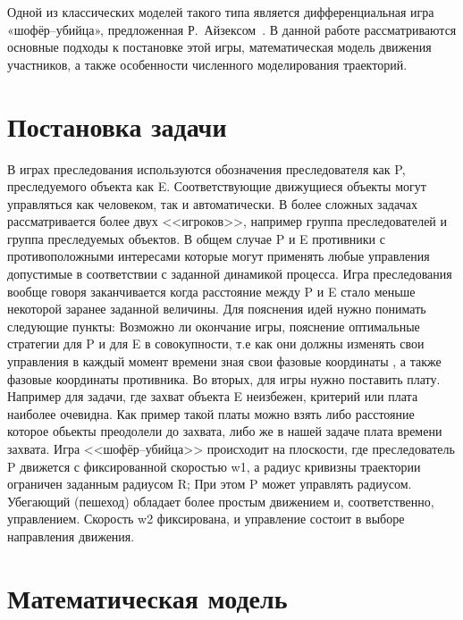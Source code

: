 \documentclass[14pt,a4paper]{extarticle}
\begin{document}
	Одной из классических моделей такого типа является дифференциальная игра «шофёр--убийца», предложенная Р.~Айзексом~\cite{isaacs}. В данной работе рассматриваются основные подходы к постановке этой игры, математическая модель движения участников, а также особенности численного моделирования траекторий.
	
	\section{Постановка задачи}
	
	В играх преследования используются обозначения преследователя как P, преследуемого объекта как E. Соответствующие движущиеся объекты могут управляться как человеком, так и автоматически. В более сложных задачах рассматривается более двух <<игроков>>, например группа преследователей и группа преследуемых объектов. В общем случае P и E противники с противоположными интересами которые могут применять любые управления допустимые в соответствии с заданной динамикой процесса. Игра преследования вообще говоря заканчивается когда расстояние между P и E стало меньше некоторой заранее заданной величины. Для пояснения идей нужно понимать следующие пункты: Возможно ли окончание игры, пояснение оптимальные стратегии для P и для E в совокупности, т.е как они должны изменять свои управления в каждый момент времени зная свои фазовые координаты , а также фазовые координаты противника. Во вторых, для игры нужно поставить плату. Например для задачи, где захват объекта E неизбежен, критерий или плата наиболее очевидна. Как пример такой платы можно взять либо расстояние которое обьекты преодолели до захвата, либо же в нашей задаче плата времени захвата. Игра <<шофёр--убийца>> происходит на плоскости, где преследователь P движется с фиксированной скоростью w1, а радиус кривизны траектории ограничен заданным радиусом R; При этом P может управлять радиусом. Убегающий (пешеход) обладает более простым движением и, соответственно, управлением. Скорость w2 фиксирована, и управление состоит в выборе направления движения.
	
	\section{Математическая модель}
	
\end{document}
